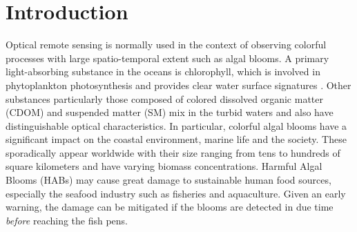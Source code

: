  \section{Introduction} \label{sec:intro}
Optical remote sensing is normally used in the context of observing colorful processes with large spatio-temporal extent such as algal blooms. A primary light-absorbing substance in the oceans is chlorophyll, which is involved in phytoplankton photosynthesis and provides clear water surface signatures \cite{Geir2011}. Other substances particularly those composed of colored dissolved organic matter (CDOM) and suspended matter (SM) mix in the turbid waters and also have distinguishable optical characteristics. In particular, colorful algal blooms have a significant impact on the coastal environment, marine life and the society. These sporadically appear worldwide \cite{jessup09} with their size ranging from tens to hundreds of square kilometers and have varying biomass concentrations. Harmful Algal Blooms (HABs) may cause great damage to sustainable human food sources, especially the seafood industry such as fisheries and aquaculture. Given an early warning, the damage can be mitigated if the blooms are detected in due time \emph{before} reaching the fish pens. 

